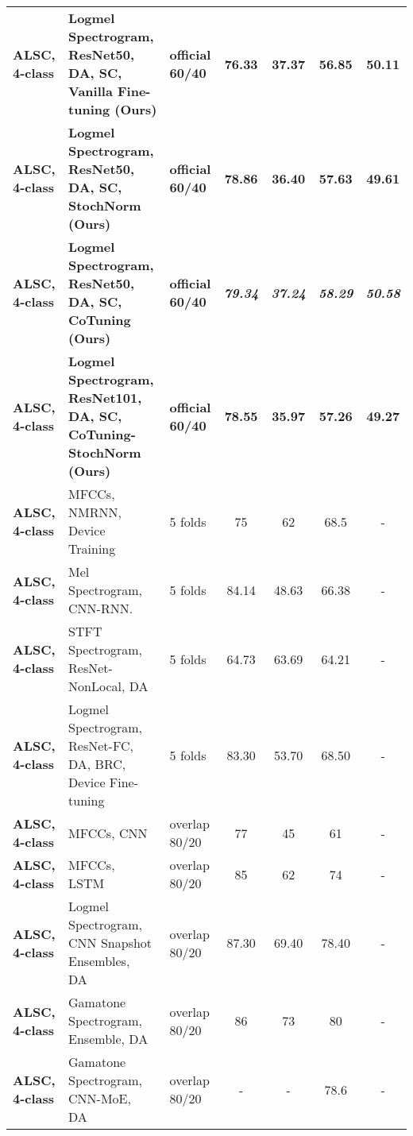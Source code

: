 \documentclass[journal]{IEEEtran}
\begin{document}
\begin{table*}[t]
{\begin{tabular}{l l l c c c c}
        \textbf{ALSC, 4-class}   & \textbf{Logmel Spectrogram, ResNet50, DA, SC, Vanilla Fine-tuning (Ours)}   & \textbf{official 60/40}  & \textbf{76.33}  & \textbf{37.37}  & \textbf{56.85} & \textbf{50.11} \\
        \textbf{ALSC, 4-class}   & \textbf{Logmel Spectrogram, ResNet50, DA, SC, StochNorm (Ours)}   & \textbf{official 60/40}  & \textbf{78.86}  & \textbf{36.40}  & \textbf{57.63} & \textbf{49.61} \\
        \textbf{ALSC, 4-class}   & \textbf{Logmel Spectrogram, ResNet50, DA, SC, CoTuning (Ours)}   & \textbf{official 60/40}  & \textit{\textbf{79.34}}  & \textit{\textbf{37.24}}  & \textit{\textbf{58.29}} & \textit{\textbf{50.58}}\\
        \textbf{ALSC, 4-class}   & \textbf{Logmel Spectrogram, ResNet101, DA, SC, CoTuning-StochNorm (Ours)}   & \textbf{official 60/40}  & \textbf{78.55}  & \textbf{35.97}  & \textbf{57.26} & \textbf{49.27}\\
        
\textbf{ALSC, 4-class}   & MFCCs, NMRNN, Device Training~\cite{kochetov2018noise}  &5 folds   & 75  & 62  & 68.5 & -\\
        \textbf{ALSC, 4-class}   & Mel Spectrogram, CNN-RNN.~\cite{acharya2020deep}  & 5 folds  & 84.14  & 48.63   & 66.38 & -\\
        \textbf{ALSC, 4-class}   & STFT Spectrogram, ResNet-NonLocal, DA~\cite{ma2020lungrn+}  & 5 folds  & 64.73  & 63.69  & 64.21 & -\\
        \textbf{ALSC, 4-class}   & Logmel Spectrogram, ResNet-FC, DA, BRC, Device Fine-tuning~\cite{gairola2020respirenet}  & 5 folds  & 83.30  & 53.70  & 68.50 & -\\
        \textbf{ALSC, 4-class}   & MFCCs, CNN~\cite{perna2018convolutional}  & overlap 80/20  & 77  & 45   & 61 & -\\
        \textbf{ALSC, 4-class}   &  MFCCs, LSTM~\cite{dPerna2019lstm} & overlap 80/20  & 85  & 62  & 74  & -\\
        \textbf{ALSC, 4-class}   & Logmel Spectrogram, CNN Snapshot Ensembles, DA~\cite{nguyen2020lung}  & overlap 80/20  & 87.30  & 69.40  & 78.40 & -\\
        \textbf{ALSC, 4-class}   & Gamatone Spectrogram, Ensemble, DA~\cite{pham2020robust}  & overlap 80/20  & 86  & 73  & 80 & - \\
        \textbf{ALSC, 4-class}   & Gamatone Spectrogram, CNN-MoE, DA~\cite{pham2021cnn}  & overlap 80/20  & -  & -  & 78.6 & - \\


\end{tabular}}
\end{table*}
\end{document}

